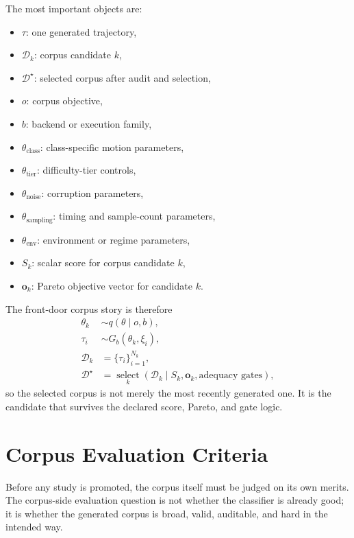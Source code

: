 \documentclass[11pt]{article}
\begin{document}
The most important objects are:
\begin{itemize}[leftmargin=1.5em]
    \item \(\tau\): one generated trajectory,
    \item \(\mathcal{D}_k\): corpus candidate \(k\),
    \item \(\mathcal{D}^{\star}\): selected corpus after audit and selection,
    \item \(o\): corpus objective,
    \item \(b\): backend or execution family,
    \item \(\theta_{\text{class}}\): class-specific motion parameters,
    \item \(\theta_{\text{tier}}\): difficulty-tier controls,
    \item \(\theta_{\text{noise}}\): corruption parameters,
    \item \(\theta_{\text{sampling}}\): timing and sample-count parameters,
    \item \(\theta_{\text{env}}\): environment or regime parameters,
    \item \(S_k\): scalar score for corpus candidate \(k\),
    \item \(\mathbf{o}_k\): Pareto objective vector for candidate \(k\).
\end{itemize}
The front-door corpus story is therefore
\begin{align}
\theta_k &\sim q(\theta \mid o, b), \\
\tau_i &\sim G_b(\theta_k, \xi_i), \\
\mathcal{D}_k &= \{\tau_i\}_{i=1}^{N_k}, \\
\mathcal{D}^{\star} &= \operatorname*{select}\limits_k(\mathcal{D}_k \mid S_k, \mathbf{o}_k, \text{adequacy gates}),
\end{align}
so the selected corpus is not merely the most recently generated one. It is the
candidate that survives the declared score, Pareto, and gate logic.

\section{Corpus Evaluation Criteria}

Before any study is promoted, the corpus itself must be judged on its own
merits. The corpus-side evaluation question is not whether the classifier is
already good; it is whether the generated corpus is broad, valid, auditable,
and hard in the intended way.
\end{document}
